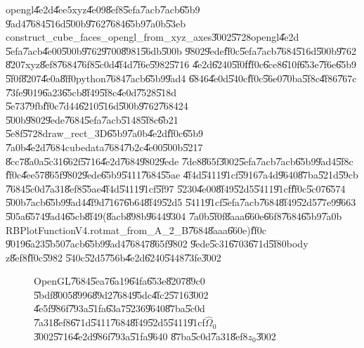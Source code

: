 opengl\U{4e2d}\U{4ee5}xyz\U{4e09}\U{8ef8}\U{5efa}\U{7acb}\U{7acb}\U{65b9}%
\U{9ad4}\U{7684}\U{516d}\U{500b}\U{9762}\U{7684}\U{65b9}\U{7a0b}\U{53eb}%
construct\_cube\_faces\_opengl\_from\_xyz\_axes\U{3002}\U{5728}opengl\U{4e2d}%
\U{5efa}\U{7acb}\U{4e00}\U{500b}\U{9762}\U{9700}\U{8981}\U{56db}\U{500b}%
\U{9802}\U{9ede}\U{ff0c}\U{5efa}\U{7acb}\U{7684}\U{516d}\U{500b}\U{9762}%
\U{8207}xyz\U{8ef8}\U{7684}\U{76f8}\U{5c0d}\U{4f4d}\U{7f6e}\U{5982}\U{5716}%
\U{4e2d}\U{6240}\U{5f0f}\U{ff0c}\U{6ce8}\U{610f}\U{653e}\U{7f6e}\U{65b9}%
\U{5f0f}\U{8207}\U{4e0a}\U{8ff0}python\U{7684}\U{7acb}\U{65b9}\U{9ad4}%
\U{6846}\U{4e0d}\U{540c}\U{ff0c}\U{56e0}\U{70ba}\U{5f8c}\U{4f86}\U{767c}%
\U{73fe}\U{9019}\U{6a23}\U{65cb}\U{8f49}\U{5f8c}\U{4e0d}\U{7528}\U{518d}%
\U{5e73}\U{79fb}\U{ff0c}\U{7d44}\U{6210}\U{516d}\U{500b}\U{9762}\U{7684}24%
\U{500b}\U{9802}\U{9ede}\U{7684}\U{5efa}\U{7acb}\U{5148}\U{5f8c}\U{6b21}%
\U{5e8f}\U{5728}draw\_rect\_3D\U{65b9}\U{7a0b}\U{4e2d}\U{ff0c}\U{65b9}%
\U{7a0b}\U{4e2d}\U{7684}cubedata\U{7684}\U{7b2c}\U{4e00}\U{500b}\U{5217}%
\U{8cc7}\U{8a0a}\U{5c31}\U{662f}\U{5716}\U{4e2d}\U{7684}\U{9802}\U{9ede}%
\U{7de8}\U{865f}\U{3002}\U{5efa}\U{7acb}\U{7acb}\U{65b9}\U{9ad4}\U{5f8c}%
\U{ff0c}\U{4ee5}7\U{865f}\U{9802}\U{9ede}\U{65b9}\U{5411}\U{7684}\U{55ae}%
\U{4f4d}\U{5411}\U{91cf}\U{5916}\U{7a4d}\U{9640}\U{87ba}\U{521d}\U{59cb}%
\U{7684}\U{5c0d}\U{7a31}\U{8ef8}\U{55ae}\U{4f4d}\U{5411}\U{91cf}\U{5f97}%
\U{5230}\U{4e00}\U{8f49}\U{52d5}\U{5411}\U{91cf}\U{ff0c}\U{5c07}\U{6574}%
\U{500b}\U{7acb}\U{65b9}\U{9ad4}\U{4f9d}\U{7167}\U{6b64}\U{8f49}\U{52d5}%
\U{5411}\U{91cf}\U{5efa}\U{7acb}\U{7684}\U{8f49}\U{52d5}\U{77e9}\U{9663}%
\U{505a}\U{6574}\U{9ad4}\U{65cb}\U{8f49}(\U{8acb}\U{898b}\U{9644}\U{9304}%
\U{7a0b}\U{5f0f}\U{8aaa}\U{660e}\U{66f8}\U{7684}\U{65b9}\U{7a0b}%
RBPlotFunctionV4.rotmat\_from\_A\_2\_B\U{7684}\U{8aaa}\U{660e})\U{ff0c}%
\U{9019}\U{6a23}\U{5b50}\U{7acb}\U{65b9}\U{9ad4}\U{7684}7\U{865f}\U{9802}%
\U{9ede}\U{5c31}\U{6703}\U{671d}\U{5f80}body z\U{8ef8}\U{ff0c}\U{5982}%
\U{540c}\U{52d5}\U{756b}\U{4e2d}\U{6240}\U{5448}\U{73fe}\U{3002}

\begin{figure}[th]
\caption{OpenGL\U{7684}\U{5ea7}\U{6a19}\U{64fa}\U{653e}\U{8207}\U{89c0}%
\U{5bdf}\U{8005}\U{8996}\U{89d2}\U{7684}\U{95dc}\U{4fc2}\U{5716}\U{3002}%
\U{4e5f}\U{986f}\U{793a}\U{51fa}\U{63a7}\U{5236}\U{9640}\U{87ba}\U{5c0d}%
\U{7a31}\U{8ef8}\U{671d}\U{5411}\U{7684}\U{8f49}\U{52d5}\U{5411}\U{91cf}$%
\hat{\Omega}_{0}$\U{3002}\U{5716}\U{4e2d}\U{986f}\U{793a}\U{51fa}\U{9640}%
\U{87ba}\U{5c0d}\U{7a31}\U{8ef8}$z_{0}$\U{3002}}
\begin{center}

\end{center}
\end{figure}

